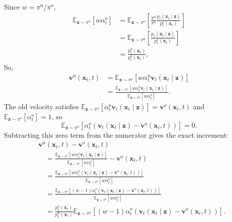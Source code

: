 \documentclass{article} %
\begin{document}
Since $w=\pi^{\mathrm{n}}/\pi^{\mathrm{o}}$,
\begin{align}
\mathbb E_{\mathbf z\sim\pi^{\mathrm{o}}}[w\alpha_t^{\mathrm{o}}]
&=\mathbb E_{\mathbf z\sim\pi^{\mathrm{o}}}[\frac{\pi^{\mathrm{n}}}{\pi^{\mathrm{o}}}\frac{p_t(\mathbf x_t\mid\mathbf z)}{p_t^{\mathrm{o}}(\mathbf x_t)}]\\
&=\mathbb E_{\mathbf z\sim\pi^{\mathrm{n}}}[\frac{p_t(\mathbf x_t\mid\mathbf z)}{p_t^{\mathrm{o}}(\mathbf x_t)}]\\
&=\frac{p_t^{\mathrm{n}}(\mathbf x_t)}{p_t^{\mathrm{o}}(\mathbf x_t)},
\label{eq:velocity-normalizer}
\end{align}
So, 
\begin{align}
\mathbf v^{\mathrm{n}}(\mathbf x_t,t)
&=\mathbb E_{\mathbf z\sim\pi^{\mathrm{o}}}
 [w\alpha_t^{\mathrm{n}}\mathbf v_t(\mathbf x_t\mid\mathbf z)]
\nonumber\\
&=\frac{\mathbb E_{\mathbf z\sim\pi^{\mathrm{o}}}
 [w\alpha_t^{\mathrm{o}}\mathbf v_t(\mathbf x_t\mid\mathbf z)]}
 {\mathbb E_{\mathbf z\sim\pi^{\mathrm{o}}}[w\alpha_t^{\mathrm{o}}]}.
\label{eq:normalized-new-velocity}
\end{align}
The old velocity satisfies
$\mathbb E_{\mathbf z\sim\pi^{\mathrm{o}}}[\alpha_t^{\mathrm{o}}\mathbf v_t(\mathbf x_t\mid\mathbf z)]
=\mathbf v^{\mathrm{o}}(\mathbf x_t,t)$ and
$\mathbb E_{\mathbf z\sim\pi^{\mathrm{o}}}[\alpha_t^{\mathrm{o}}]=1$, so
\begin{equation}
\mathbb E_{\mathbf z\sim\pi^{\mathrm{o}}}
 [\alpha_t^{\mathrm{o}}(\mathbf v_t(\mathbf x_t\mid\mathbf z)-\mathbf v^{\mathrm{o}}(\mathbf x_t,t))]=0.
\label{eq:centered-old-velocity}
\end{equation}
Subtracting this zero term from the numerator gives the exact increment:
\begin{align}
&\mathbf v^{\mathrm{n}}(\mathbf x_t,t)-\mathbf v^{\mathrm{o}}(\mathbf x_t,t)
\nonumber\\
&\quad=\frac{\mathbb E_{\mathbf z\sim\pi^{\mathrm{o}}}
 [w\alpha_t^{\mathrm{o}}\mathbf v_t(\mathbf x_t\mid\mathbf z)]}
 {\mathbb E_{\mathbf z\sim\pi^{\mathrm{o}}}[w\alpha_t^{\mathrm{o}}]} 
-\mathbf v^{\mathrm{o}}(\mathbf x_t,t)
\nonumber\\
&\quad=\frac{\mathbb E_{\mathbf z\sim\pi^{\mathrm{o}}}
 [w\alpha_t^{\mathrm{o}}(\mathbf v_t(\mathbf x_t\mid\mathbf z)-\mathbf v^{\mathrm{o}}(\mathbf x_t,t))]}
 {\mathbb E_{\mathbf z\sim\pi^{\mathrm{o}}}[w\alpha_t^{\mathrm{o}}]}
\nonumber\\
&\quad=\frac{\mathbb E_{\mathbf z\sim\pi^{\mathrm{o}}}
 [(w-1)\alpha_t^{\mathrm{o}}(\mathbf v_t(\mathbf x_t\mid\mathbf z)-\mathbf v^{\mathrm{o}}(\mathbf x_t,t))]}
 {\mathbb E_{\mathbf z\sim\pi^{\mathrm{o}}}[w\alpha_t^{\mathrm{o}}]}
\nonumber\\
&\quad=\frac{p_t^{\mathrm{o}}(\mathbf x_t)}{p_t^{\mathrm{n}}(\mathbf x_t)}
 \mathbb E_{\mathbf z\sim\pi^{\mathrm{o}}}
 [(w-1)\alpha_t^{\mathrm{o}}(\mathbf v_t(\mathbf x_t\mid\mathbf z)-\mathbf v^{\mathrm{o}}(\mathbf x_t,t))].
\label{eq:exact-residual-increment}
\end{align}
\end{document}
